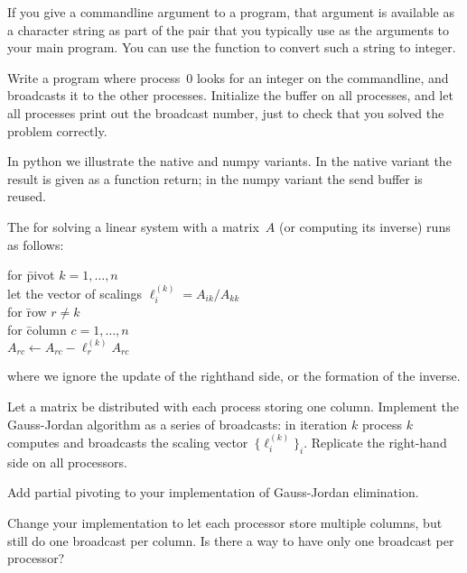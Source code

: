 

\begin{exercise}
  \label{ex:argv-bcast}
  If you give a commandline argument to a program, that argument is available
  as a character string as part of the  pair that you typically use
  as the arguments to your main program. You can use the function  to
  convert such a string to integer.

  Write a program where process~0 looks for an integer on the commandline, and
  broadcasts it to the other processes. Initialize the buffer on all processes, and
  let all processes print out the broadcast number,
  just to check that you solved the problem correctly.
\end{exercise}

In python we illustrate the native and numpy variants. In the native
variant the result is given as a function return; in the numpy variant
the send buffer is reused.
%

\begin{exercise}
  \label{ex:gaussjordancoll}
  The  for solving a linear system
  with a matrix~$A$ (or computing its inverse) runs as follows:
  \begin{tabbing}
    for \=pivot $k=1,\ldots,n$\\
    \>let the vector of scalings $\ell^{(k)}_i=A_{ik}/A_{kk}$\\
    \>for \=row $r\not=k$\\
    \>\>for \=column $c=1,\ldots,n$\\
    \>\>\> $A_{rc}\leftarrow A_{rc} - \ell^{(k)}_r A_{rc}$\\
  \end{tabbing}
  where we ignore the update of the righthand side, or the formation
  of the inverse.

  Let a matrix be distributed with each process storing one
  column. Implement the Gauss-Jordan algorithm as a series of
  broadcasts: in iteration $k$ process $k$ computes and broadcasts the
  scaling vector~$\{\ell^{(k)}_i\}_i$. Replicate the right-hand side on
  all processors.
\end{exercise}

\begin{exercise}
  Add partial pivoting to your implementation of Gauss-Jordan elimination.

  Change your implementation to let each processor store multiple columns,
  but still do one broadcast per column. Is there a way to have only one
  broadcast per processor?
\end{exercise}

